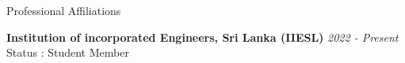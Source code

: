 \documentclass[
	11pt, %
]{./assets/resume} %
\begin{document}


\begin{rSection}{Professional Affiliations}

	\textbf{Institution of incorporated Engineers, Sri Lanka (IIESL)} \hfill \textit{2022 - Present} \\ 
	Status : Student Member

\end{rSection}









\end{document}
